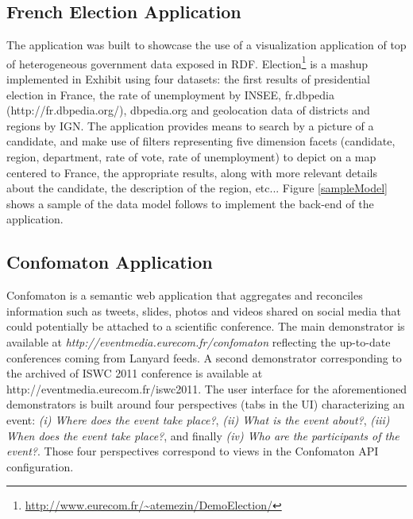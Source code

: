 \documentclass[a4paper,11pt]{report}
\begin{document}
\subsection{French Election Application}
The application was built to showcase the use of a visualization application of top of heterogeneous government data exposed in RDF.
Election\footnote{\url{http://www.eurecom.fr/~atemezin/DemoElection/}} is a mashup implemented in Exhibit using four datasets: the first results of presidential election in France, the rate of unemployment by INSEE,
fr.dbpedia (http://fr.dbpedia.org/), dbpedia.org and geolocation data of districts and regions by IGN. The application provides means to search by a picture of 
a candidate, and make use of filters representing five dimension facets (candidate, region, department, rate of vote, rate of unemployment) to depict on 
a map centered to France, the appropriate results, along with more relevant details about the candidate, the description of the region, etc... Figure \ref{sampleModel} shows 
a sample of the data model follows to implement the back-end of the application.   


\subsection{Confomaton Application}
Confomaton \cite{khrouf-eswc2012} is a semantic web application that aggregates and reconciles information such as tweets, slides, photos and videos shared on social media that could potentially be attached to a scientific conference. The main demonstrator is available at \textit{http://eventmedia.eurecom.fr/confomaton} reflecting the up-to-date conferences coming from Lanyard feeds. A second demonstrator corresponding to the archived of ISWC 2011 conference \cite{khrouf-ramms12} is available at http://eventmedia.eurecom.fr/iswc2011. The user interface for the aforementioned demonstrators is built around four perspectives (tabs in the UI) characterizing an event: \textit{(i) Where does the event take place?}, \textit{(ii) What is the event about?},  \textit{(iii) When does the event take place?}, and finally \textit{(iv) Who are the participants of the event?}. Those four perspectives correspond to views in the Confomaton API configuration. 

\end{document}
